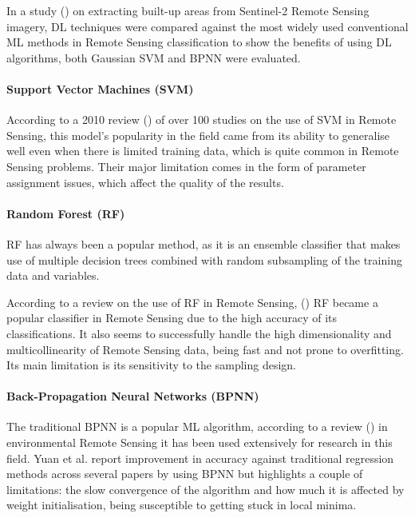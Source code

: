 In a study (\cite{isprs-archives-XLII-3-79-2018}) on extracting built-up areas from Sentinel-2 Remote Sensing imagery, \gls{DL} techniques were compared against the most widely used conventional \gls{ML} methods in Remote Sensing classification to show the benefits of using \gls{DL} algorithms, both Gaussian \gls{SVM} and \gls{BPNN} were evaluated.

\paragraph{Support Vector Machines (SVM)}
According to a 2010 review (\cite{MOUNTRAKIS2011247}) of over 100 studies on the use of \gls{SVM} in Remote Sensing, this model's popularity in the field came from its ability to generalise well even when there is limited training data, which is quite common in Remote Sensing problems. Their major limitation comes in the form of parameter assignment issues, which affect the quality of the results.

\paragraph{Random Forest (RF)}
\gls{RF} has always been a popular method, as it is an ensemble classifier that makes use of multiple decision trees combined with random subsampling of the training data and variables. 

According to a review on the use of \gls{RF} in Remote Sensing, (\cite{BELGIU201624}) \gls{RF} became a popular classifier in Remote Sensing due to the high accuracy of its classifications. It also seems to successfully handle the high dimensionality and multicollinearity of Remote Sensing data, being fast and not prone to overfitting. Its main limitation is its sensitivity to the sampling design.

\paragraph{Back-Propagation Neural Networks (BPNN)}
The traditional \gls{BPNN} is a popular \gls{ML} algorithm, according to a review (\cite{YUAN2020111716}) in environmental Remote Sensing it has been used extensively for research in this field. Yuan et al. report improvement in accuracy against traditional regression methods across several papers by using \gls{BPNN} but highlights a couple of limitations: the slow convergence of the algorithm and how much it is affected by weight initialisation, being susceptible to getting stuck in local minima. 

